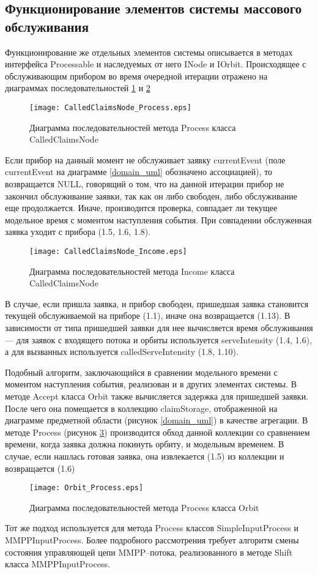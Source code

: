 \subsection{Функционирование элементов системы массового обслуживания}
Функционирование же отдельных элементов системы описывается в методах интерфейса Processable и наследуемых от него INode и IOrbit.
Происходящее с обслуживающим прибором во время очередной итерации отражено на диаграммах последовательностей \ref{CalledClaimsNode_Process_uml} и \ref{CalledClaimsNode_Income_uml}
\begin{figure}[H]
	\centering
	\texttt{[image: CalledClaimsNode\_Process.eps]}
	\caption{Диаграмма последовательностей метода Process класса CalledClaimsNode}
	\label{CalledClaimsNode_Process_uml}
\end{figure}
Если прибор на данный момент не обслуживает заявку currentEvent (поле currentEvent на диаграмме \ref{domain_uml} обозначено ассоциацией), то возвращается NULL, говорящий о том, что на данной итерации прибор не закончил обслуживание заявки, так как он либо свободен, либо обслуживание еще продолжается. Иначе, производится проверка, совпадает ли текущее модельное время с моментом наступления события. При совпадении обслуженная заявка уходит с прибора (1.5, 1.6, 1.8).
\begin{figure}[H]
	\centering
	\texttt{[image: CalledClaimsNode\_Income.eps]}
	\caption{Диаграмма последовательностей метода Income класса CalledClaimsNode}
	\label{CalledClaimsNode_Income_uml}
\end{figure}
В случае, если пришла заявка, и прибор свободен, пришедшая заявка становится текущей обслуживаемой на приборе (1.1), иначе она возвращается (1.13). В зависимости от типа пришедшей заявки для нее вычисляется время обслуживания --- для заявок с входящего потока и орбиты используется serveIntensity (1.4, 1.6), а для  вызванных используется calledServeIntensity (1.8, 1.10).

Подобный алгоритм, заключающийся в сравнении модельного времени с моментом наступления события, реализован и в других элементах системы.
В методе Accept класса Orbit также вычисляется задержка для пришедшей заявки. После чего она помещается в коллекцию claimStorage, отображенной на диаграмме предметной области (рисунок \ref{domain_uml}) в качестве агрегации. В методе Process (рисунок \ref{Orbit_Process_uml}) производится обход данной коллекции со сравнением времени, когда заявка должна покинуть орбиту, и модельным временем. В случае, если нашлась готовая заявка, она извлекается (1.5) из коллекции и возвращается (1.6)
 \begin{figure}[H]
 	\centering
 	\texttt{[image: Orbit\_Process.eps]}
 	\caption{Диаграмма последовательностей метода Process класса Orbit}
 	\label{Orbit_Process_uml}
 \end{figure}
Тот же подход используется для метода Process классов SimpleInputProcess и \\ MMPPInputProcess. Более подробного рассмотрения требует алгоритм смены состояния управляющей цепи MMPP--потока, реализованного в методе Shift класса MMPPInputProcess.

